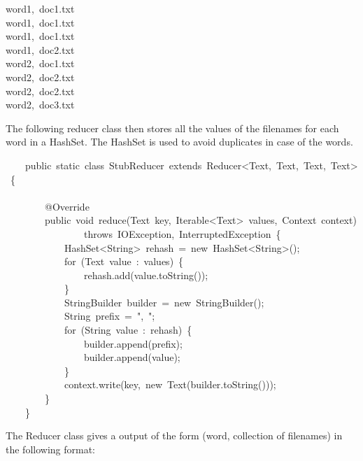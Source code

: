 \documentclass{article}
\begin{document}
\begin{mdpre}%
\noindent word1,~doc1.txt\\
word1,~doc1.txt\\
word1,~doc1.txt\\
word1,~doc2.txt\\
word2,~doc1.txt\\
word2,~doc2.txt\\
word2,~doc2.txt\\
word2,~doc3.txt%
\end{mdpre}\noindent The following reducer class then stores all the values of the filenames for each word in a HashSet. The HashSet is used to avoid duplicates in case of the words.
\begin{mdpre}%
\noindent~~~~{public}~{static}~{class}~StubReducer~{extends}~Reducer\textless{}Text,~Text,~Text,~Text\textgreater{}~\{\\
\\
~~~~~~~~@Override\\
~~~~~~~~{public}~{void}~reduce(Text~key,~Iterable\textless{}Text\textgreater{}~values,~Context~context)\\
~~~~~~~~~~~~~~~~{throws}~IOException,~InterruptedException~\{\\
~~~~~~~~~~~~HashSet\textless{}String\textgreater{}~rehash~=~{new}~HashSet\textless{}String\textgreater{}();\\
~~~~~~~~~~~~{for}~(Text~value~:~values)~\{\\
~~~~~~~~~~~~~~~~rehash.add(value.{toString}());\\
~~~~~~~~~~~~\}\\
~~~~~~~~~~~~StringBuilder~builder~=~{new}~StringBuilder();\\
~~~~~~~~~~~~String~prefix~=~{"}{,~}{"};\\
~~~~~~~~~~~~{for}~(String~value~:~rehash)~\{\\
~~~~~~~~~~~~~~~~builder.append(prefix);\\
~~~~~~~~~~~~~~~~builder.append(value);\\
~~~~~~~~~~~~\}\\
~~~~~~~~~~~~context.write(key,~{new}~Text(builder.{toString}()));\\
~~~~~~~~\}\\
~~~~\}%
\end{mdpre}\noindent The Reducer class gives a  output of the form (word, collection of filenames) in the following format:
\end{document}
